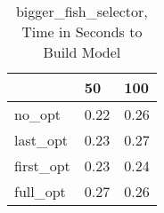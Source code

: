 \begin{table}
\caption{bigger\_fish\_selector, Time in Seconds to Build Model}
\label{bigger_fish_selector_model_time}
\begin{tabular}{lll}
\toprule
 & 50 & 100 \\
\midrule
no\_opt & 0.22 & 0.26 \\
last\_opt & 0.23 & 0.27 \\
first\_opt & 0.23 & 0.24 \\
full\_opt & 0.27 & 0.26 \\
\bottomrule
\end{tabular}
\end{table}
